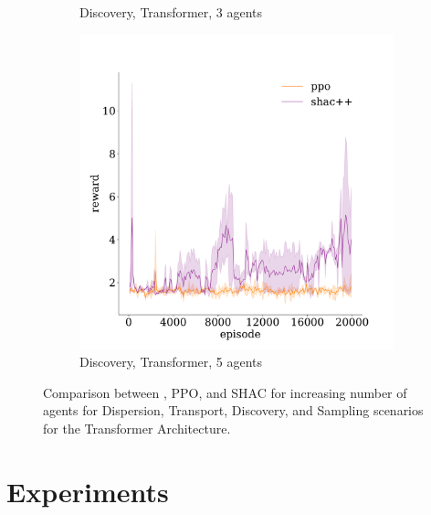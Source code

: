 \begin{figure}[!t]
\begin{subfigure}[b]{0.32\textwidth}
        \caption{Discovery, Transformer, 3 agents}
        \label{fig:discovery-transformer-3}
    \end{subfigure}
    \begin{subfigure}[b]{0.32\textwidth}
        \includegraphics[width=\textwidth]{figs/discovery-5-transformer.pdf}
        \caption{Discovery, Transformer, 5 agents}
        \label{fig:discovery-transformer-5}
    \end{subfigure}

    \caption{Comparison between \fname{}, PPO, and SHAC for increasing number of agents for Dispersion, Transport, Discovery, and Sampling scenarios for the Transformer Architecture.}
    \label{fig:experiments}

\end{figure}

\section{Experiments}\label{sect:experiments}

